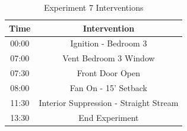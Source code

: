 \documentclass{article}
\begin{document}
\begin{table}[H]
	\centering
	\caption{Experiment 7 Interventions}
	\begin{tabular}{|c|c|} 
		\hline
		Time & Intervention \\ \hline \hline
		00:00 & Ignition - Bedroom 3 \\ \hline
		07:00 & Vent Bedroom 3 Window \\ \hline
		07:30 & Front Door Open \\ \hline
		08:00 & Fan On - 15' Setback \\ \hline
		11:30 & Interior Suppression - Straight Stream\\ \hline
		13:30 & End Experiment\\ \hline
	\end{tabular}
	\label{Table:Exp7Interventions}
\end{table}
\end{document}
